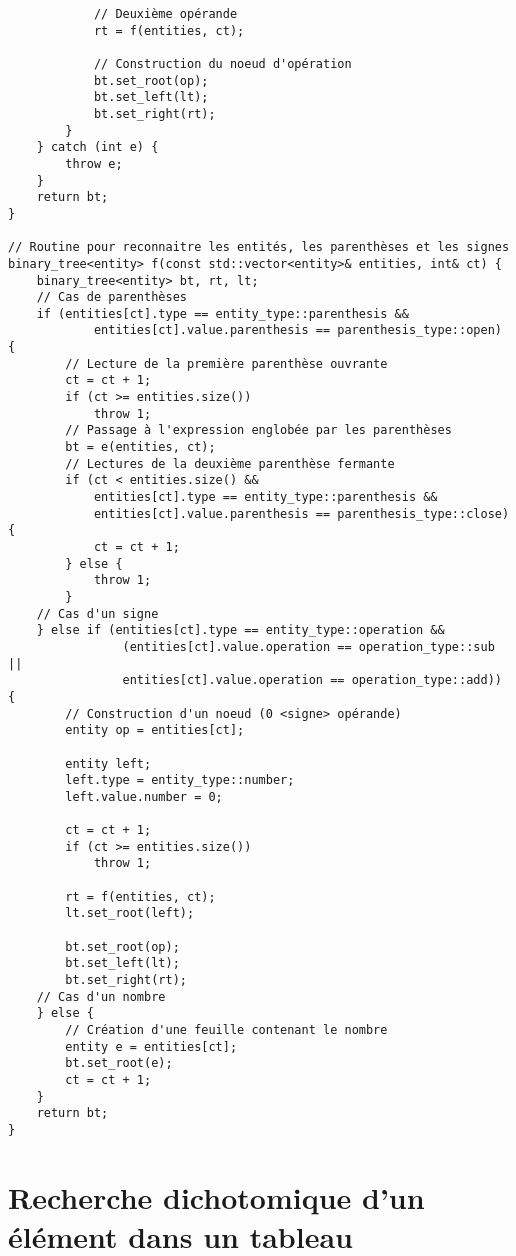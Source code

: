 \begin{verbatim}
            // Deuxième opérande
            rt = f(entities, ct);

            // Construction du noeud d'opération
            bt.set_root(op);
            bt.set_left(lt);
            bt.set_right(rt);
        }
    } catch (int e) {
        throw e;
    }
    return bt;
}

// Routine pour reconnaitre les entités, les parenthèses et les signes
binary_tree<entity> f(const std::vector<entity>& entities, int& ct) {
    binary_tree<entity> bt, rt, lt;
    // Cas de parenthèses
    if (entities[ct].type == entity_type::parenthesis &&
            entities[ct].value.parenthesis == parenthesis_type::open) {
        // Lecture de la première parenthèse ouvrante
        ct = ct + 1;
        if (ct >= entities.size())
            throw 1;
        // Passage à l'expression englobée par les parenthèses
        bt = e(entities, ct);
        // Lectures de la deuxième parenthèse fermante
        if (ct < entities.size() &&
            entities[ct].type == entity_type::parenthesis &&
            entities[ct].value.parenthesis == parenthesis_type::close) {
            ct = ct + 1;
        } else {
            throw 1;
        }
    // Cas d'un signe
    } else if (entities[ct].type == entity_type::operation &&
                (entities[ct].value.operation == operation_type::sub ||
                entities[ct].value.operation == operation_type::add)) {
        // Construction d'un noeud (0 <signe> opérande)
        entity op = entities[ct];

        entity left;
        left.type = entity_type::number;
        left.value.number = 0;

        ct = ct + 1;
        if (ct >= entities.size())
            throw 1;

        rt = f(entities, ct);
        lt.set_root(left);

        bt.set_root(op);
        bt.set_left(lt);
        bt.set_right(rt);
    // Cas d'un nombre
    } else {
        // Création d'une feuille contenant le nombre
        entity e = entities[ct];
        bt.set_root(e);
        ct = ct + 1;
    }
    return bt;
}
\end{verbatim}

\section{Recherche dichotomique d'un élément dans un tableau}

